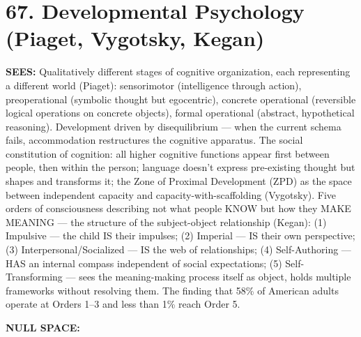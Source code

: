 \section*{67. Developmental Psychology (Piaget, Vygotsky, Kegan)}


\textbf{SEES:} Qualitatively different stages of cognitive organization, each representing a different world (Piaget): sensorimotor (intelligence through action), preoperational (symbolic thought but egocentric), concrete operational (reversible logical operations on concrete objects), formal operational (abstract, hypothetical reasoning). Development driven by disequilibrium — when the current schema fails, accommodation restructures the cognitive apparatus. The social constitution of cognition: all higher cognitive functions appear first between people, then within the person; language doesn't express pre-existing thought but shapes and transforms it; the Zone of Proximal Development (ZPD) as the space between independent capacity and capacity-with-scaffolding (Vygotsky). Five orders of consciousness describing not what people KNOW but how they MAKE MEANING — the structure of the subject-object relationship (Kegan): (1) Impulsive — the child IS their impulses; (2) Imperial — IS their own perspective; (3) Interpersonal/Socialized — IS the web of relationships; (4) Self-Authoring — HAS an internal compass independent of social expectations; (5) Self-Transforming — sees the meaning-making process itself as object, holds multiple frameworks without resolving them. The finding that 58\% of American adults operate at Orders 1–3 and less than 1\% reach Order 5.


\textbf{NULL SPACE:}

